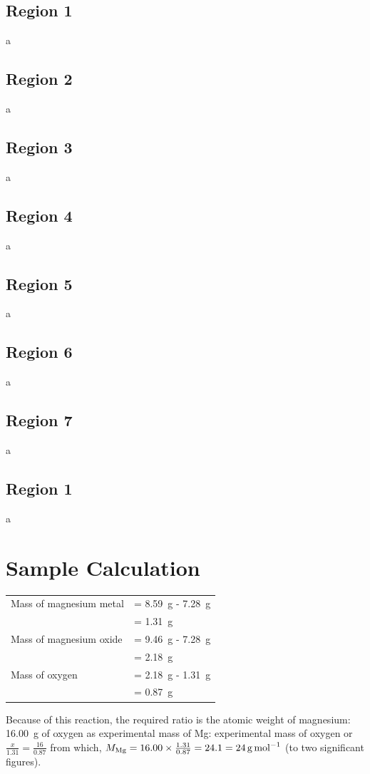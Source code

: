 \documentclass{article}
\begin{document}
\subsection{Region 1}
a
\subsection{Region 2}
a
\subsection{Region 3}
a
\subsection{Region 4}
a
\subsection{Region 5}
a
\subsection{Region 6}
a
\subsection{Region 7}
a
\subsection{Region 1}
a


\section{Sample Calculation}

\begin{tabular}{ll}
Mass of magnesium metal & = \SI{8.59}{\gram} - \SI{7.28}{\gram}\\
& = \SI{1.31}{\gram}\\
Mass of magnesium oxide & = \SI{9.46}{\gram} - \SI{7.28}{\gram}\\
& = \SI{2.18}{\gram}\\
Mass of oxygen & = \SI{2.18}{\gram} - \SI{1.31}{\gram}\\
& = \SI{0.87}{\gram}
\end{tabular}

Because of this reaction, the required ratio is the atomic weight of magnesium: \SI{16.00}{\gram} of oxygen as experimental mass of Mg: experimental mass of oxygen or $\frac{x}{1.31}=\frac{16}{0.87}$ from which, $M_{\ce{Mg}} = 16.00 \times \frac{1.31}{0.87} = 24.1 = \SI{24}{\gram\per\mole}$ (to two significant figures).
\end{document}
